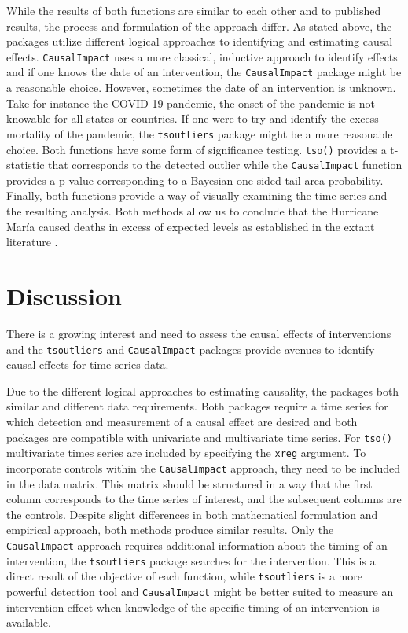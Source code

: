 \documentclass[12pt]{article}
\begin{document}
While the results of both functions are similar to each other and to
published results, the process and formulation of the approach differ.
As stated above, the packages utilize different logical approaches to
identifying and estimating causal effects. \texttt{CausalImpact} uses a
more classical, inductive approach to identify effects and if one knows
the date of an intervention, the \texttt{CausalImpact} package might be
a reasonable choice. However, sometimes the date of an intervention is
unknown. Take for instance the COVID-19 pandemic, the onset of the
pandemic is not knowable for all states or countries. If one were to try
and identify the excess mortality of the pandemic, the
\texttt{tsoutliers} package might be a more reasonable choice. Both
functions have some form of significance testing. \texttt{tso()}
provides a t-statistic that corresponds to the detected outlier while
the \texttt{CausalImpact} function provides a p-value corresponding to a
Bayesian-one sided tail area probability. Finally, both functions
provide a way of visually examining the time series and the resulting
analysis. Both methods allow us to conclude that the Hurricane María
caused deaths in excess of expected levels as established in the extant
literature \citep{sandberg2019all}.

\hypertarget{discussion}{%
\section{Discussion}\label{discussion}}

There is a growing interest and need to assess the causal effects of
interventions \citep{pearl2009causality} and the \texttt{tsoutliers} and
\texttt{CausalImpact} packages provide avenues to identify causal
effects for time series data.

Due to the different logical approaches to estimating causality, the
packages both similar and different data requirements. Both packages
require a time series for which detection and measurement of a causal
effect are desired and both packages are compatible with univariate and
multivariate time series. For \texttt{tso()} multivariate times series
are included by specifying the \texttt{xreg} argument. To incorporate
controls within the \texttt{CausalImpact} approach, they need to be
included in the data matrix. This matrix should be structured in a way
that the first column corresponds to the time series of interest, and
the subsequent columns are the controls. Despite slight differences in
both mathematical formulation and empirical approach, both methods
produce similar results. Only the \texttt{CausalImpact} approach
requires additional information about the timing of an intervention, the
\texttt{tsoutliers} package searches for the intervention. This is a
direct result of the objective of each function, while
\texttt{tsoutliers} is a more powerful detection tool and
\texttt{CausalImpact} might be better suited to measure an intervention
effect when knowledge of the specific timing of an intervention is
available.
\end{document}
